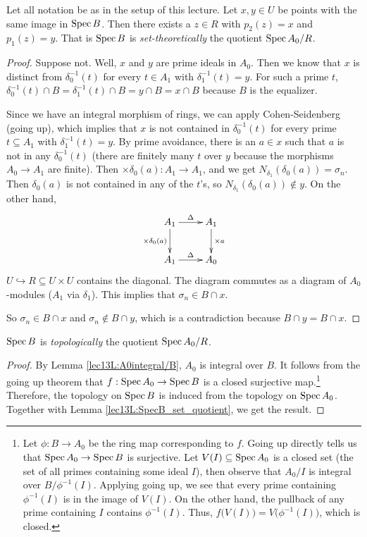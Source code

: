  \begin{lemma}\label{lec13L:SpecB_set_quotient}
   Let all notation be as in the setup of this lecture. Let $x,y\in U$ be points with
   the same image in $\operatorname{Spec} B$. Then there exists a $z\in R$ with $p_2(z)=x$ and
   $p_1(z)=y$. That is $\operatorname{Spec} B$ is \emph{set-theoretically} the quotient $\operatorname{Spec}
   A_0/R$.
 \end{lemma}
 \begin{proof}
   Suppose not. Well, $x$ and $y$ are prime ideals in $A_0$. Then we know that $x$ is
   distinct from $\delta_0^{-1}(t)$ for every $t\in A_1$ with $\delta_1^{-1}(t)=y$. For
   such a prime $t$, $\delta_0^{-1}(t)\cap B=\delta_1^{-1}(t)\cap B = y\cap B=x\cap B$
   because $B$ is the equalizer.

   Since we have an integral morphism of rings, we can apply Cohen-Seidenberg (going
   up), which implies that $x$ is not contained in $\delta_0^{-1}(t)$ for every prime
   $t\subseteq A_1$ with $\delta_1^{-1}(t)=y$. By prime avoidance, there is an $a\in x$
   such that $a$ is not in any $\delta_0^{-1}(t)$ (there are finitely many $t$ over $y$
   because the morphisms $A_0\to A_1$ are finite). Then $\times \delta_0(a):A_1\to
   A_1$, and we get $N_{\delta_1}(\delta_0(a))=\sigma_n$. Then $\delta_0(a)$ is not
   contained in any of the $t$'s, so $N_{\delta_1}(\delta_0(a))\not\in y$. On the other
   hand,
   \[\xymatrix{
     A_1 \ar[d]_{\times \delta_0(a)} \ar[r]^\Delta & A_1 \ar[d]^{\times a}\\
     A_1\ar[r]^\Delta & A_0
   }\]
   $U\hookrightarrow R\subseteq U\times U$ contains the diagonal. The diagram commutes
   as a diagram of $A_0$-modules ($A_1$ via $\delta_1$). This implies that $\sigma_n\in
   B\cap x$.

   So $\sigma_n\in B\cap x$ and $\sigma_n\not\in B\cap y$, which is a contradiction
   because $B\cap y=B\cap x$.
   \renewcommand{\qedsymbol}{$\square_\text{Lemma}$}
 \end{proof}
 \begin{corollary}\label{lec13C:SpecB_topological_quotient}
   $\operatorname{Spec} B$ is \emph{topologically} the quotient $\operatorname{Spec} A_0/R$.
 \end{corollary}
 \begin{proof}
   By Lemma \ref{lec13L:A0integral/B}, $A_0$ is integral over $B$. It follows from the
   going up theorem that $f:\operatorname{Spec} A_0\to \operatorname{Spec} B$ is a closed surjective
   map.\footnote{Let $\phi:B\to A_0$ be the ring map corresponding to $f$. Going up
   directly tells us that $\operatorname{Spec} A_0\to \operatorname{Spec} B$ is surjective. Let $V(I)\subseteq
   \operatorname{Spec} A_0$ is a closed set (the set of all primes containing some ideal $I$), then
   observe that $A_0/I$ is integral over $B/\phi^{-1}(I)$. Applying going up, we see
   that every prime containing $\phi^{-1}(I)$ is in the image of $V(I)$. On the other
   hand, the pullback of any prime containing $I$ contains $\phi^{-1}(I)$. Thus,
   $f\bigl(V(I)\bigr) = V\bigl(\phi^{-1}(I)\bigr)$, which is closed.} Therefore, the
   topology on $\operatorname{Spec} B$ is induced from the topology on $\operatorname{Spec} A_0$. Together with
   Lemma \ref{lec13L:SpecB_set_quotient}, we get the result.
 \end{proof}

